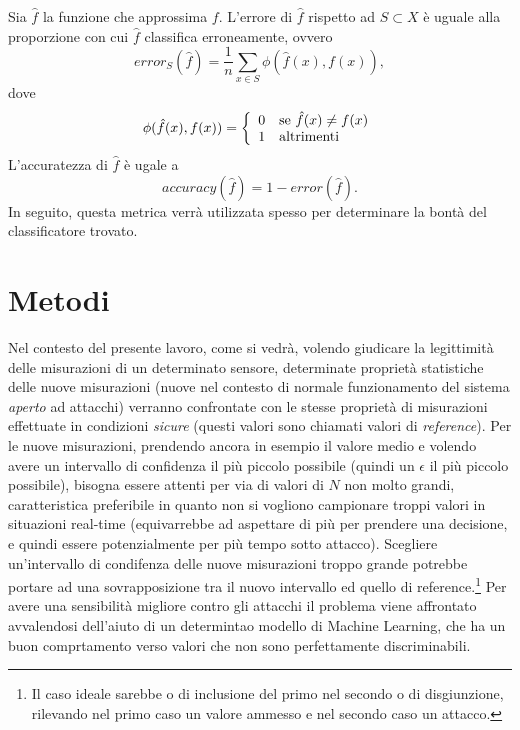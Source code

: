 \documentclass[Lau,binding=0.6cm]{sapthesis}
\begin{document}
Sia $\hat{f}$ la funzione che approssima $f$. L'errore di $\hat{f}$ rispetto ad $S \subset X$ \`e uguale alla proporzione con cui $\hat{f}$ classifica erroneamente, ovvero
\begin{equation}
    error_{S}(\hat{f}) = \frac{1}{n} \sum_{x\in S} \phi(\hat{f}(x), f(x)),
\end{equation}
dove
\begin{equation}
    \phi(\hat{f}(x), f(x)) = \left\{
        \begin{array}{rl}
            0 & \mbox{se $ \hat{f}(x) \ne f(x)$}\\
            1 & \mbox{altrimenti}
        \end{array}
    \right
    .
\end{equation}
L'accuratezza di $\hat{f}$ \`e ugale a
\begin{equation}
    accuracy(\hat{f}) = 1 - error(\hat{f}).
\end{equation}
In seguito, questa metrica verr\`a utilizzata spesso per determinare la bont\`a del classificatore trovato.


\chapter{Metodi}\label{chap:3}


Nel contesto del presente lavoro, come si vedr\`a, volendo giudicare la legittimit\`a delle misurazioni di un determinato sensore, determinate propriet\`a statistiche delle nuove misurazioni (nuove nel contesto di normale 
funzionamento del sistema \textit{aperto} ad attacchi) verranno confrontate con le stesse propriet\`a di misurazioni effettuate in condizioni \textit{sicure} (questi valori sono chiamati valori di \textit{reference}). 
Per le nuove misurazioni, prendendo ancora in esempio il valore medio e volendo avere un intervallo di confidenza il pi\`u piccolo possibile (quindi un $\epsilon$ il pi\`u piccolo possibile), bisogna essere attenti per via di valori di $N$ non molto grandi,
caratteristica preferibile in quanto non si vogliono campionare troppi valori in situazioni real-time (equivarrebbe ad aspettare di pi\`u per prendere una decisione, e quindi essere potenzialmente per più tempo sotto attacco).
Scegliere un'intervallo di condifenza delle nuove misurazioni troppo grande potrebbe portare ad una sovrapposizione tra il nuovo intervallo ed quello di reference.\footnote{Il caso ideale sarebbe o di inclusione del primo nel secondo o di disgiunzione, rilevando nel primo caso un valore ammesso e nel secondo caso un attacco.}
Per avere una sensibilit\`a migliore contro gli attacchi il problema viene affrontato avvalendosi dell'aiuto di un determintao modello di Machine Learning, 
che ha un buon comprtamento verso valori che non sono perfettamente discriminabili.
\end{document}
